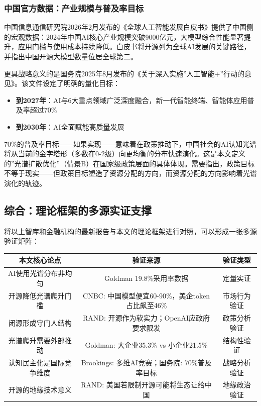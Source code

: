 \documentclass[12pt,a4paper]{ctexart}
\begin{document}
\subsubsection{中国官方数据：产业规模与普及率目标}

中国信息通信研究院2026年2月发布的《全球人工智能发展白皮书》提供了中国侧的宏观数据：2024年中国AI核心产业规模突破9000亿元，大模型综合性能显著提升，应用门槛与使用成本持续降低。白皮书将开源列为全球AI发展的关键路径，并指出中国开源大模型数量位居全球第二。

更具战略意义的是国务院2025年8月发布的《关于深入实施''人工智能+''行动的意见》。该文件设定了明确的量化目标：
\begin{itemize}
\item \textbf{到2027年}：AI与6大重点领域广泛深度融合，新一代智能终端、智能体应用普及率超过70\%
\item \textbf{到2030年}：AI全面赋能高质量发展
\end{itemize}

70\%的普及率目标——如果实现——意味着在政策推动下，中国社会的AI认知光谱将从当前的金字塔形（多数在0-2级）向更均衡的分布快速演化。这是本文定义的''光谱扩散优化''（情景B）在国家级政策层面的具体体现。需要指出，政策目标不等于现实——但政策目标塑造了资源分配的方向，而资源分配的方向影响着光谱演化的轨迹。

\subsection{综合：理论框架的多源实证支撑}

将以上智库和金融机构的最新报告与本文的理论框架进行对照，可以形成一张多源验证矩阵：

\begin{center}
\begin{tabular}{c|c|c}
\hline
本文核心论点 & 验证来源 & 验证类型 \\
\hline
AI使用光谱分布非均匀 & Goldman 19.8\%采用率数据 & 定量实证 \\
开源降低光谱爬升门槛 & CNBC: 中国模型便宜60-90\%，美企token占比飙至46\% & 市场行为验证 \\
闭源形成守门人结构 & RAND: 开源作为软实力；OpenAI应政府要求限发 & 政策分析验证 \\
光谱爬升需要外部推动 & Goldman: 大企业35.3\% vs 小企业21.5\% & 结构性验证 \\
认知民主化是国际竞争维度 & Brookings: 多维AI竞赛；国务院: 70\%普及率目标 & 战略分析验证 \\
开源的地缘技术意义 & RAND: 美国若限制开源可能将生态让给中国 & 地缘政治验证 \\
\hline
\end{tabular}
\end{center}
\end{document}
